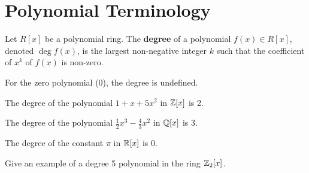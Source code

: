 \section{Polynomial Terminology}
\begin{definition}
    Let $R[x]$ be a polynomial ring. The \textbf{degree} of a polynomial $f(x) \in R[x]$, denoted $\deg f(x)$, is the largest non-negative integer $k$ such that the coefficient of $x^k$ of $f(x)$ is non-zero.
\end{definition}
\begin{remark}
    For the zero polynomial (0), the degree is undefined.
\end{remark}
\begin{example}
    The degree of the polynomial $1+x+5x^2$ in $\mathbb{Z}[x]$ is 2.
\end{example}
\begin{example}
    The degree of the polynomial $\frac12x^3 - \frac43x^2$ in $\mathbb{Q}[x]$ is 3.
\end{example}
\begin{example}
    The degree of the constant $\pi$ in $\mathbb{R}[x]$ is 0.
\end{example}

\begin{exercise}
    Give an example of a degree 5 polynomial in the ring $\mathbb{Z}_2[x]$.
\end{exercise}

